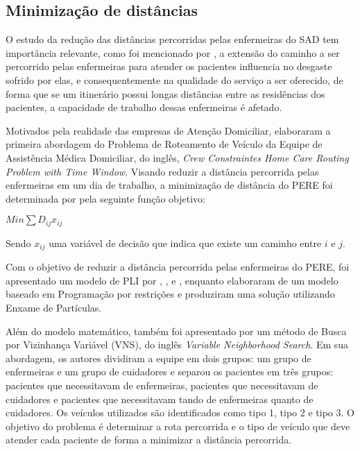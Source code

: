\subsection{Minimização de distâncias}

O estudo da redução das distâncias percorridas pelas enfermeiras do \ac{SAD} tem importância relevante, como foi mencionado por , a extensão do caminho a ser percorrido pelas enfermeiras para atender os pacientes influencia no desgaste sofrido por elas, e consequentemente na qualidade do serviço a ser oferecido, de forma que se um itinerário possui longas distâncias entre as residências dos pacientes, a capacidade de trabalho dessas enfermeiras é afetado.

Motivados pela realidade das empresas de Atenção Domiciliar,  elaboraram a primeira abordagem do Problema de Roteamento de Veículo da Equipe de Assistência Médica Domiciliar, do inglês, \textit{Crew Constraintes Home Care Routing Problem with Time Window}.
Visando reduzir a distância percorrida pelas enfermeiras em um dia de trabalho, a minimização de distância do \ac{PERE} foi determinada por  pela seguinte função objetivo:  

\begin{center}
$Min \sum D_{ij}x_{ij}$
\end{center}

Sendo $x_{ij}$ uma variável de decisão que indica que existe um caminho entre $i$ e $j$.

Com o objetivo de reduzir a distância percorrida pelas enfermeiras do \ac{PERE}, foi apresentado um modelo de  \ac{PLI} por , , \cite{Decerle:2016} e , enquanto  elaboraram de um modelo baseado em Programação por restrições e  produziram uma solução utilizando Enxame de Partículas. 

Além do modelo matemático, também foi apresentado por  um método de Busca por Vizinhança Variável (VNS), do inglês \textit{Variable Neighborhood Search}. 
Em sua abordagem, os autores dividiram a equipe em dois grupos: um grupo de enfermeiras e um grupo de cuidadores e separou os pacientes em três grupos: pacientes que necessitavam de enfermeiras, pacientes que necessitavam de cuidadores e pacientes que necessitavam tando de enfermeiras quanto de cuidadores.
Os veículos utilizados são identificados como tipo 1, tipo 2 e tipo 3.
O objetivo do problema é determinar a rota percorrida e o tipo de veículo que deve atender cada paciente de forma a minimizar a distância percorrida.

